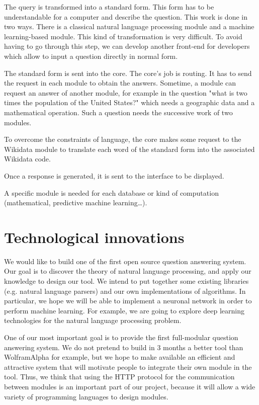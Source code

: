 \documentclass[a4paper,10pt]{article}
\begin{document}
The query is transformed into a standard form. This form has to be understandable 
for a computer and describe the question. This work is done in two ways. There is 
a classical natural language processing module and a machine learning-based module. 
This kind of transformation is very difficult. To avoid having to go through this 
step, we can develop another front-end for developers which allow to input a question
 directly in normal form.

The standard form is sent into the core. The core's job is routing. It has to send 
the request in each module to obtain the answers. Sometime, a module can request 
an answer of another module, for example in the question "what is two times the 
population of the United States?" which needs a geographic data and a mathematical
 operation. Such a question needs the successive work of two modules.

To overcome the constraints of language, the core makes some request to the Wikidata
 module to translate each word of the standard form into the associated Wikidata 
 code.

Once a response is generated, it is sent to the interface to be displayed.

A specific module is needed for each database or kind of computation (mathematical, 
predictive machine learning\ldots).

\section{Technological innovations}

We would like to build one of the first open source question answering system. 
Our goal is to discover the theory of natural language processing, and apply our 
knowledge to design our tool. We intend to put together some existing libraries 
(e.g. natural language parsers) and our own implementations of algorithms. In 
particular, we hope we will be able to implement a neuronal network in order to 
perform machine learning. For example, we are going to explore deep learning
technologies for the natural language processing problem.

One of our most important goal is to provide the first full-modular question 
answering system. We do not pretend to build in 3 months a better tool than 
WolframAlpha for example, but we hope to make available an efficient and 
attractive system that will motivate people to integrate their own module in the 
tool. Thus, we think that using the HTTP protocol for the communication between 
modules is an important part of our project, because it will allow a wide variety 
of programming languages to design modules.
\end{document}
